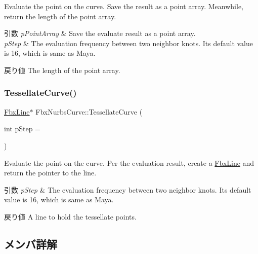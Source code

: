 Evaluate the point on the curve. Save the result as a point array. Meanwhile, return the length of the point array. 
\begin{DoxyParams}{引数}
{\em p\+Point\+Array} & Save the evaluate result as a point array. \\
\hline
{\em p\+Step} & The evaluation frequency between two neighbor knots. Its default value is 16, which is same as Maya. \\
\hline
\end{DoxyParams}
\begin{DoxyReturn}{戻り値}
The length of the point array. 
\end{DoxyReturn}
\mbox{\label{class_fbx_nurbs_curve_a535cb7925acf214dee68598777067fd7}} 
\subsubsection{\texorpdfstring{Tessellate\+Curve()}{TessellateCurve()}\hspace{0.1cm}{\footnotesize\ttfamily [2/2]}}
{\footnotesize\ttfamily \hyperlink{class_fbx_line}{Fbx\+Line}$\ast$ Fbx\+Nurbs\+Curve\+::\+Tessellate\+Curve (\begin{DoxyParamCaption}\item[{int}]{p\+Step = {} }\end{DoxyParamCaption})}

Evaluate the point on the curve. Per the evaluation result, create a \hyperlink{class_fbx_line}{Fbx\+Line} and return the pointer to the line. 
\begin{DoxyParams}{引数}
{\em p\+Step} & The evaluation frequency between two neighbor knots. Its default value is 16, which is same as Maya. \\
\hline
\end{DoxyParams}
\begin{DoxyReturn}{戻り値}
A line to hold the tessellate points. 
\end{DoxyReturn}


\subsection{メンバ詳解}
\mbox{\label{class_fbx_nurbs_curve_ac8f0d2eb033d7cc5f8bb906ff67f82bc}} 
